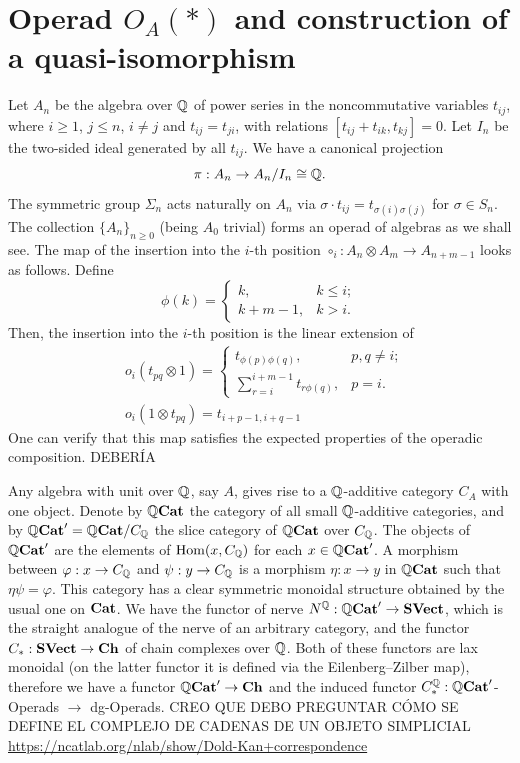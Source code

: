 \documentclass[TFM.tex]{subfiles}
\begin{document}
\section{Operad $O_A(*)$ and construction of a quasi-isomorphism}

Let $A_n$ be the algebra over $\mathbb{Q}$ of power series in the noncommutative variables $t_{ij}$, where $i\geq 1$, $j\leq n$, $i\neq j$ and $t_{ij}=t_{ji}$, with relations $[t_{ij}+t_{ik},t_{kj}]=0$. Let $I_n$ be the two-sided ideal generated by all $t_{ij}$. We have a canonical projection 
\begin{equation}\label{canonical}
\pi:A_n\to A_n/I_n\cong\mathbb{Q}.
\end{equation}
The symmetric group $\Sigma_n$ acts naturally on $A_n$ via $\sigma\cdot t_{ij}=t_{\sigma(i)\sigma(j)}$ for $\sigma\in S_n$. The collection $\{A_n\}_{n\geq 0}$ (being $A_0$ trivial) forms an operad of algebras as we shall see. The map of the insertion into the $i$-th position $\circ_i: A_n\otimes A_m\to A_{n+m-1}$ looks as follows. Define
\[
\phi(k)=\begin{cases}
k, & k\leq i;\\
k+m-1, & k>i.
\end{cases}
\]
Then, the insertion into the $i$-th position is the linear extension of
\begin{align*}
&o_i(t_{pq}\otimes 1)=\begin{cases}
t_{\phi(p)\phi(q)}, &p,q\neq i;\\
\sum_{r=i}^{i+m-1}t_{r\phi(q)}, & p=i.
\end{cases} \\
& o_i(1\otimes t_{pq})=t_{i+p-1,i+q-1}
\end{align*}
One can verify that this map satisfies the expected properties of the operadic composition. DEBERÍA 

Any algebra with unit over $\mathbb{Q}$, say $A$, gives rise to a $\mathbb{Q}$-additive category $C_A$ with one object. Denote by $\mathbb{Q}\mathrm{\mathbf{Cat}}$ the category of all small $\mathbb{Q}$-additive categories, and by $\mathbb{Q}\mathrm{\mathbf{Cat}}'=\mathbb{Q}\mathrm{\mathbf{Cat}}/C_{\mathbb{Q}}$ the slice category of $\mathbb{Q}\mathrm{\mathbf{Cat}}$ over $C_{\mathbb{Q}}$. The objects of $\mathbb{Q}\mathrm{\mathbf{Cat}}'$ are the elements of $\operatorname{Hom}(x, C_{\mathbb{Q}})$ for each $x\in \mathbb{Q}\mathrm{\mathbf{Cat}}'$. A morphism between $\varphi:x\to C_{\mathbb{Q}}$ and $\psi:y\to C_{\mathbb{Q}}$ is a morphism $\eta: x\to y$ in $\mathbb{Q}\mathrm{\mathbf{Cat}}$ such that $\eta\psi=\varphi$.  This category has a clear symmetric monoidal structure obtained by the usual one on $\mathrm{\mathbf{Cat}}$. We have the functor of nerve
$N^{\mathbb{Q}}: \mathbb{Q}\mathrm{\mathbf{Cat}}'\to \mathrm{\mathbf{SVect}}$, which is the straight analogue of the nerve of an arbitrary
category, and the functor $C_*: \mathrm{\mathbf{SVect}} \to\mathrm{\mathbf{Ch}}$ of chain complexes over $\mathbb{Q}$. Both of these functors are lax monoidal (on the latter functor it is defined via the Eilenberg–Zilber map), therefore we have a functor $\mathbb{Q}\mathrm{\mathbf{Cat}}'\to\mathrm{\mathbf{Ch}}$ and the induced functor $C_*^{\mathbb{Q}}:\mathbb{Q}\mathrm{\mathbf{Cat}}'$-Operads $\to$ dg-Operads. CREO QUE DEBO PREGUNTAR CÓMO SE DEFINE EL COMPLEJO DE CADENAS DE UN OBJETO SIMPLICIAL \url{https://ncatlab.org/nlab/show/Dold-Kan+correspondence}
\end{document}
